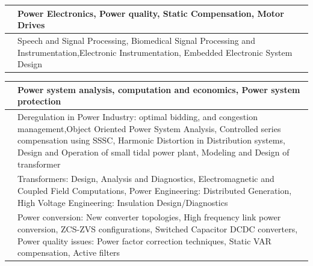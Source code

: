 \documentclass[openany]{book} %
\begin{document}
\begin{tabular}{p{4.5cm} p{9cm}}
\href{https://www.ee.iitb.ac.in/~mukul/}{\color{blue}{Prof. Mukul C. Chandorkar }} & Power Electronics, Power quality, Static Compensation, Motor Drives \\ 
\hline 

\href{https://www.ee.iitb.ac.in/~pcpandey/}{\color{blue}{Prof. Prem C. Pandey}} & Speech and Signal Processing, Biomedical Signal Processing and Instrumentation,Electronic Instrumentation, Embedded Electronic System Design \\ 
\hline 
\end{tabular}


\begin{tabular}{p{4.5cm} p{9cm}}


\href{https://www.ee.iitb.ac.in/wiki/faculty/soman}{\color{blue}{Prof. Shreevardhan A. Soman}}  & Power system analysis, computation and economics, Power system protection \\ 
\hline 

\href{https://www.ee.iitb.ac.in/wiki/faculty/sak}{\color{blue}{Prof. Shrikrishna A. Khaparde }} & Deregulation in Power Industry: optimal bidding, and congestion management,Object Oriented Power System Analysis, Controlled series compensation using SSSC, Harmonic Distortion in Distribution systems, Design and Operation of small tidal power plant, Modeling and Design of transformer \\ 
\hline 

\href{https://www.ee.iitb.ac.in/wiki/faculty/svk}{\color{blue}{Prof. Shrikrishna V. Kulkarni }} & Transformers: Design, Analysis and Diagnostics, Electromagnetic and Coupled Field Computations, Power Engineering: Distributed Generation, High Voltage Engineering: Insulation Design/Diagnostics \\ 
\hline 

\href{https://www.ee.iitb.ac.in/~agarwal/}{\color{blue}{Prof. Vivek Agarwal }} & Power conversion: New converter topologies, High frequency link
power conversion, ZCS-ZVS configurations, Switched Capacitor DCDC converters, Power quality issues: Power factor correction techniques, Static VAR compensation, Active filters \\ 
\hline 

\end{tabular} 
\end{document}
